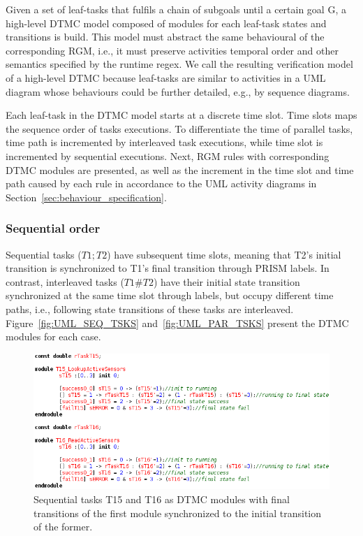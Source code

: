 Given a set of leaf-tasks that fulfils a chain of subgoals until a certain goal G, a high-level DTMC model composed of modules for each leaf-task states and transitions is build. This model must abstract the same behavioural of the corresponding RGM, i.e., it must preserve activities temporal order and other semantics specified by the runtime regex. We call the resulting verification model of a high-level DTMC because leaf-tasks are similar to activities in a UML diagram whose behaviours could be further detailed, e.g., by sequence diagrams. 


Each leaf-task in the DTMC model starts at a discrete time slot. Time slots maps the sequence order of tasks executions. To differentiate the time of parallel tasks, time path is incremented by interleaved task executions, while time slot is incremented by sequential executions. Next, RGM rules with corresponding DTMC modules are presented, as well as the increment in the time slot and time path caused by each rule in accordance to the UML activity diagrams in Section~\ref{sec:behaviour_specification}.

\subsubsection{Sequential order}

Sequential tasks ($T1;T2$) have subsequent time slots, meaning that T2's initial transition is synchronized to T1's final transition through PRISM labels. In contrast, interleaved tasks ($T1\#T2$) have their initial state transition synchronized at the same time slot through labels, but occupy different time paths, i.e., following state transitions of these tasks are interleaved.  Figure~\ref{fig:UML_SEQ_TSKS} and~\ref{fig:UML_PAR_TSKS} present the DTMC modules for each case.

\begin{figure}[ht!]
\centering
\includegraphics[width=1\textwidth]{imgs/PRISM_SEQ_TSKS.png}
\caption{Sequential tasks T15 and T16 as DTMC modules with final transitions of the first module synchronized to the initial transition of the former.}
\label{fig:PRISM_SEQ_TSKS}
\end{figure}

